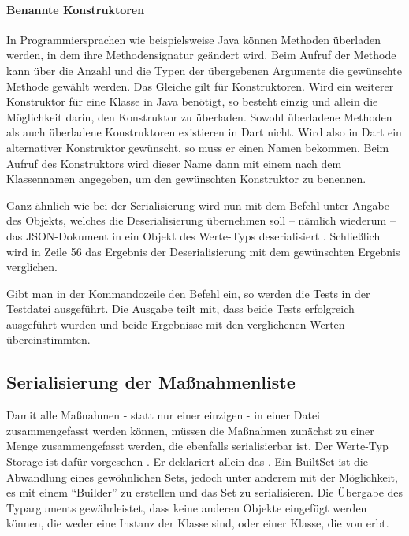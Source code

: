 \paragraph{Benannte Konstruktoren} In Programmiersprachen wie beispielsweise Java können Methoden überladen werden, in dem ihre Methodensignatur geändert wird.
Beim Aufruf der Methode kann über die Anzahl und die Typen der übergebenen Argumente die gewünschte Methode gewählt werden.
Das Gleiche gilt für Konstruktoren.
Wird ein weiterer Konstruktor für eine Klasse in Java benötigt, so besteht einzig und allein die Möglichkeit darin, den Konstruktor zu überladen.
Sowohl überladene Methoden als auch überladene Konstruktoren existieren in Dart nicht.
Wird also in Dart ein alternativer Konstruktor gewünscht, so muss er einen Namen bekommen.
Beim Aufruf des Konstruktors wird dieser Name dann mit einem  nach dem Klassennamen angegeben, um den gewünschten Konstruktor zu benennen.


Ganz ähnlich wie bei der Serialisierung wird nun mit dem Befehl    unter Angabe des Objekts, welches die Deserialisierung übernehmen soll -- nämlich wiederum  -- das JSON-Dokument in ein Objekt des Werte-Typs  deserialisiert . Schließlich wird in Zeile 56 das Ergebnis der Deserialisierung mit dem gewünschten Ergebnis verglichen.



Gibt man in der Kommandozeile den Befehl    ein, so werden die Tests in der Testdatei ausgeführt. Die Ausgabe  teilt mit, dass beide Tests erfolgreich ausgeführt wurden und beide Ergebnisse mit den verglichenen Werten übereinstimmten.

\subsection{Serialisierung der Maßnahmenliste}

Damit alle Maßnahmen - statt nur einer einzigen - in einer Datei zusammengefasst werden können, müssen die Maßnahmen zunächst zu einer Menge zusammengefasst werden, die ebenfalls serialisierbar ist.
Der Werte-Typ Storage ist dafür vorgesehen \Lst{\ref{lst:Schritt1WerteTypStorage}}.
Er deklariert allein das  .
Ein BuiltSet ist die Abwandlung eines gewöhnlichen Sets, jedoch unter anderem mit der Möglichkeit, es mit einem \enquote{Builder} zu erstellen und das Set zu serialisieren.
Die Übergabe des Typarguments  gewährleistet, dass keine anderen Objekte eingefügt werden können, die weder eine Instanz der Klasse  sind, oder einer Klasse, die von  erbt.

